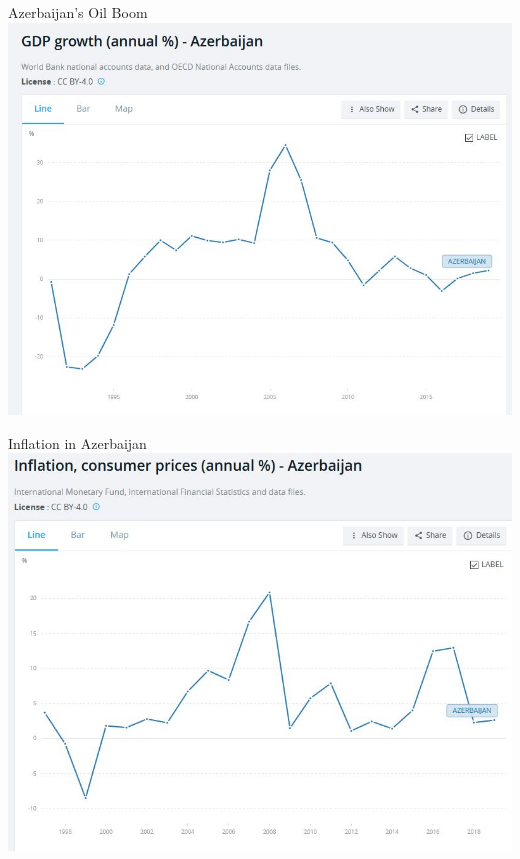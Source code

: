 \documentclass{beamer}
\begin{document}
\begin{frame}{\LARGE Azerbaijan's Oil Boom}
	\centering
	\includegraphics[width=\textwidth,height=0.8\textheight,keepaspectratio]{azerbaijan growth.JPG}
\end{frame}

\begin{frame}{\LARGE Inflation in Azerbaijan}
	\centering
	\includegraphics[width=\textwidth,height=0.8\textheight,keepaspectratio]{azerbaijan inflation.JPG}
\end{frame}
\end{document}
